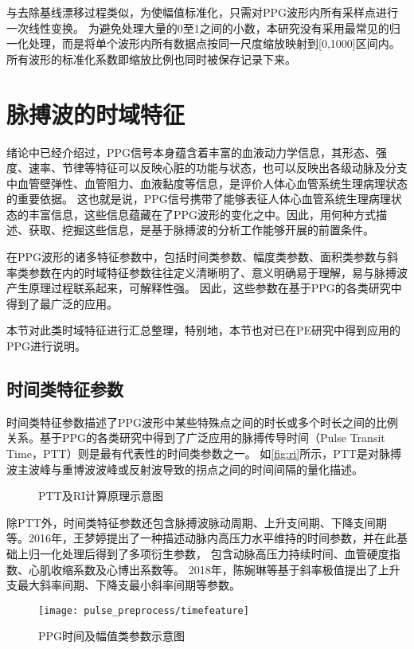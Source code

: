 与去除基线漂移过程类似，为使幅值标准化，只需对PPG波形内所有采样点进行一次线性变换。
为避免处理大量的0至1之间的小数，本研究没有采用最常见的归一化处理，而是将单个波形内所有数据点按同一尺度缩放映射到[0,1000]区间内。
所有波形的标准化系数即缩放比例也同时被保存记录下来。

\section{脉搏波的时域特征}
绪论中已经介绍过，PPG信号本身蕴含着丰富的血液动力学信息，其形态、强度、速率、节律等特征可以反映心脏的功能与状态，也可以反映出各级动脉及分支中血管壁弹性、血管阻力、血液黏度等信息，是评价人体心血管系统生理病理状态的重要依据\cite{PPGYY}。
这也就是说，PPG信号携带了能够表征人体心血管系统生理病理状态的丰富信息，这些信息蕴藏在了PPG波形的变化之中。因此，用何种方式描述、获取、挖掘这些信息，是基于脉搏波的分析工作能够开展的前置条件。

在PPG波形的诸多特征参数中，包括时间类参数、幅度类参数、面积类参数与斜率类参数在内的时域特征参数往往定义清晰明了、意义明确易于理解，易与脉搏波产生原理过程联系起来，可解释性强。
因此，这些参数在基于PPG的各类研究中得到了最广泛的应用\cite{cwl,mmt}。

本节对此类时域特征进行汇总整理，特别地，本节也对已在PE研究中得到应用的PPG进行说明。

\subsection{时间类特征参数}
时间类特征参数描述了PPG波形中某些特殊点之间的时长或多个时长之间的比例关系。基于PPG的各类研究中得到了广泛应用的脉搏传导时间（Pulse Transit Time，PTT）则是最有代表性的时间类参数之一\cite{Brumfield2005,Su2014}。
如\autoref{fig:ri}所示，PTT是对脉搏波主波峰与重博波波峰或反射波导致的拐点之间的时间间隔的量化描述。
\begin{figure}[htbp]
    \centering
    \quad
    \caption[PTT及RI计算原理示意图]{\label{fig:ri}PTT及RI计算原理示意图\cite{Su2014}}
\end{figure}

除PTT外，时间类特征参数还包含脉搏波脉动周期、上升支间期、下降支间期等。2016年，王梦婷\cite{mmt}提出了一种描述动脉内高压力水平维持的时间参数，并在此基础上归一化处理后得到了多项衍生参数，
包含动脉高压力持续时间、血管硬度指数、心肌收缩系数及心博出系数等。
2018年，陈婉琳等\cite{cwl}基于斜率极值提出了上升支最大斜率间期、下降支最小斜率间期等参数。
\begin{figure}[htbp]
    \centering
    \texttt{[image: pulse\_preprocess/timefeature]}
    \caption[常见的PPG时间及幅值类参数示意图]{\label{fig:timefeature}PPG时间及幅值类参数示意图}
\end{figure}

